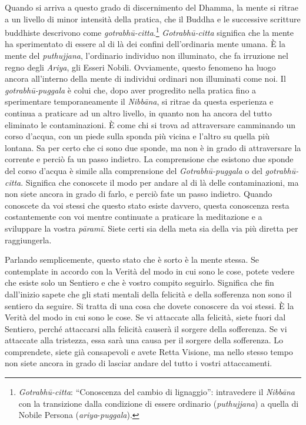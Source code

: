 Quando si arriva a questo grado di discernimento del Dhamma, la mente si
ritrae a un livello di minor intensità della pratica, che il Buddha e le
successive scritture buddhiste descrivono come
\emph{gotrabhū-citta}.\footnote{\emph{Gotrabhū-citta}: ``Conoscenza del
  cambio di lignaggio'': intravedere il \emph{Nibbāna} con la
  transizione dalla condizione di essere ordinario (\emph{puthujjana}) a
  quella di Nobile Persona (\emph{ariya}-\emph{puggala}).}
\emph{Gotrabhū-citta} significa che la mente ha sperimentato di essere
al di là dei confini dell'ordinaria mente umana. È la mente del
\emph{puthujjana}, l'ordinario individuo non illuminato, che fa
irruzione nel regno degli \emph{Ariya}, gli Esseri Nobili. Ovviamente,
questo fenomeno ha luogo ancora all'interno della mente di individui
ordinari non illuminati come noi. Il \emph{gotrabhū-puggala} è colui
che, dopo aver progredito nella pratica fino a sperimentare
temporaneamente il \emph{Nibbāna}, si ritrae da questa esperienza e
continua a praticare ad un altro livello, in quanto non ha ancora del
tutto eliminato le contaminazioni. È come chi si trova ad attraversare
camminando un corso d'acqua, con un piede sulla sponda più vicina e
l'altro su quella più lontana. Sa per certo che ci sono due sponde, ma
non è in grado di attraversare la corrente e perciò fa un passo
indietro. La comprensione che esistono due sponde del corso d'acqua è
simile alla comprensione del \emph{Gotrabhū-puggala} o del
\emph{gotrabhū-citta}. Significa che conoscete il modo per andare al di
là delle contaminazioni, ma non siete ancora in grado di farlo, e perciò
fate un passo indietro. Quando conoscete da voi stessi che questo stato
esiste davvero, questa conoscenza resta costantemente con voi mentre
continuate a praticare la meditazione e a sviluppare la vostra
\emph{pāramī}. Siete certi sia della meta sia della via più diretta per
raggiungerla.

Parlando semplicemente, questo stato che è sorto è la mente stessa. Se
contemplate in accordo con la Verità del modo in cui sono le cose,
potete vedere che esiste solo un Sentiero e che è vostro compito
seguirlo. Significa che fin dall'inizio sapete che gli stati mentali
della felicità e della sofferenza non sono il sentiero da seguire. Si
tratta di una cosa che dovete conoscere da voi stessi. È la Verità del
modo in cui sono le cose. Se vi attaccate alla felicità, siete fuori dal
Sentiero, perché attaccarsi alla felicità causerà il sorgere della
sofferenza. Se vi attaccate alla tristezza, essa sarà una causa per il
sorgere della sofferenza. Lo comprendete, siete già consapevoli e avete
Retta Visione, ma nello stesso tempo non siete ancora in grado di
lasciar andare del tutto i vostri attaccamenti.

